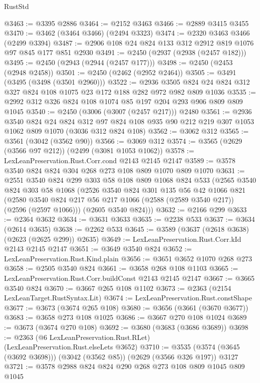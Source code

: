\begin{lexlean}{RustStd}
\begin{coremodule}
@3463 := @3395 @2886
@3464 := @2152 @3463
@3466 := @2889 @3415 @3455
@3470 := @3462 (@3464 @3466) (@2494 @3323)
@3474 := @2320 @3463 @3466 (@2499 @3394)
@3487 := @2906 @108 @24 @824 @133 @312 @2912 @819 @1076 @97 @845 @177 @851 @2930
@3491 := @2450 (@2937 (@2938 (@2457 @182)))
@3495 := @2450 (@2943 (@2944 (@2457 @177)))
@3498 := @2450 (@2453 (@2948 @2458))
@3501 := @2450 (@2462 (@2952 @2464))
@3505 := @3491 (@3495 (@3498 (@3501 @2960)))
@3522 := @2936 @3505 @824 @24 @824 @312 @327 @824 @108 @1075 @23 @172 @188 @282 @972 @982 @809 @1036
@3535 := @2992 @312 @326 @824 @108 @1074 @85 @197 @204 @293 @906 @809 @809 @1045
@3540 := @2450 (@3006 (@3007 (@2457 @217))) @2480
@3561 := @2936
    @3540
    @824
    @24
    @824
    @312
    @97
    @824
    @108
    @935
    @90
    @212
    @219
    @307
    @1053
    @1062
    @809
    @1070
    (@3036 @312 @824 @108)
@3562 := @3062 @312
@3565 := @3561 (@3042 (@3562 @90))
@3566 := @3069 @312
@3574 := @3565 (@2629 (@3566 @97 @212)) (@2499 (@3081 @1053 @1062))
@3578 := LexLeanPreservation.Rust.Corr.cond @2143 @2145 @2147
@3589 := @3578 @3540 @824 @824 @304 @268 @273 @108 @809 @1070 @809 @1070
@3631 := @2551
    @3540
    @824
    @299
    @303
    @58
    @108
    @809
    @1068
    @824
    @533
    (@2565
      @3540
      @824
      @303
      @58
      @1068
      (@2526
        @3540
        @824
        @301
        @135
        @56
        @42
        @1066
        @821
        (@2580 @3540 @824 @217 @56 @217 @1066 (@2588 (@2589 @3540 @217)) (@2596 (@2597 @1066)))
        (@2605 @3540 @824)))
@3632 := @2166 @299
@3633 := @2364 @3632
@3634 := @3631 @3633
@3635 := @2238 @533
@3637 := @3634 (@2614 @3635)
@3638 := @2262 @533
@3645 := @3589 (@3637 (@2618 @3638) (@2623 (@2625 @299)) @2635)
@3649 := LexLeanPreservation.Rust.Corr.kId @2143 @2145 @2147
@3651 := @3649 @3540 @824
@3652 := LexLeanPreservation.Rust.Kind.plain
@3656 := @3651 @3652 @1070 @268 @273
@3658 := @2505 @3540 @824
@3661 := @3658 @268 @108 @1103
@3665 := LexLeanPreservation.Rust.Corr.buildConst @2143 @2145 @2147
@3667 := @3665 @3540 @824
@3670 := @3667 @265 @108 @1102
@3673 := @2363 (@2154 LexLeanTarget.RustSyntax.Lit)
@3674 := LexLeanPreservation.Rust.constShape
@3677 := @3673 (@3674 @265 @108)
@3680 := @3656 (@3661 (@3670 @3677))
@3683 := @3658 @273 @108 @1025
@3686 := @3667 @270 @108 @1024
@3689 := @3673 (@3674 @270 @108)
@3692 := @3680 (@3683 (@3686 @3689))
@3698 := @2363 (@6 LexLeanPreservation.Rust.RLet) (LexLeanPreservation.Rust.elseLets @3652)
@3710 := @3535 (@3574 (@3645 (@3692 @3698))) (@3042 (@3562 @85)) (@2629 (@3566 @326 @197)) @3127
@3721 := @3578 @2988 @824 @824 @290 @268 @273 @108 @809 @1045 @809 @1045

\end{coremodule}
\end{lexlean}
